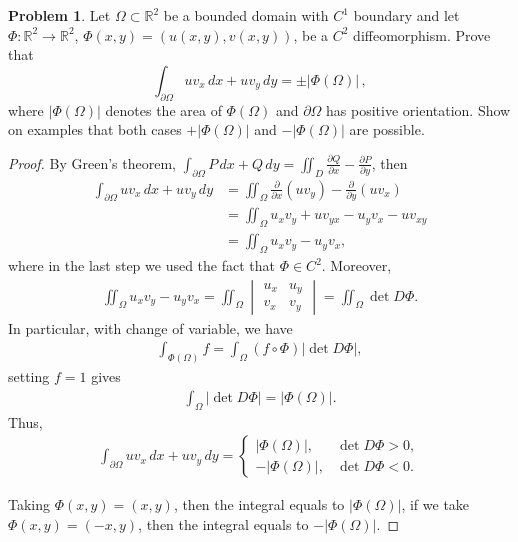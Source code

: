 \documentclass[11pt]{article}
\theoremstyle{definition}
\newtheorem{problem}{Problem}
\theoremstyle{definition}
\begin{document}
\medskip

\begin{problem}
Let $\Omega\subset\mathbb{R}^2$ be a bounded
domain with $C^1$ boundary and let $\Phi: \mathbb{R}^2 \to \mathbb{R}^2$, $\Phi(x,y) = (u(x,y), v(x,y))$,
be a $C^2$ diffeomorphism. Prove that
$$
\int_{\partial\Omega} uv_x\, dx + uv_y\, dy = \pm|\Phi(\Omega)|\, ,
$$
where $|\Phi(\Omega)|$ denotes the area of $\Phi(\Omega)$ and $\partial\Omega$ has positive orientation. Show on examples that both cases $+|\Phi(\Omega)|$ and $-|\Phi(\Omega)|$ are possible.
\end{problem}
\begin{proof}
By Green's theorem, $\int_{\partial \Omega} P\, dx + Q\, dy = \iint_D \frac{\partial Q}{\partial x} - \frac{\partial P}{\partial y}$, then
\begin{align*}
    \int_{\partial\Omega} uv_x\, dx + uv_y\, dy & = \iint_\Omega \frac{\partial}{\partial x} \left(uv_y \right) - \frac{\partial}{\partial y} \left(uv_x \right) \\
    & = \iint_\Omega u_xv_y + u v_{yx} - u_y v_x - u v_{xy} \\
    & = \iint_\Omega u_xv_y - u_y v_x,
\end{align*}
where in the last step we used the fact that $\Phi \in C^2$. Moreover, 
\begin{align*}
    \iint_\Omega u_xv_y - u_y v_x = \iint_\Omega \begin{vmatrix}
        u_x & u_y \\
        v_x & v_y
    \end{vmatrix} = \iint_\Omega \det D\Phi.
\end{align*}
In particular, with change of variable, we have
\begin{align*}
    \int_{\Phi(\Omega)} f = \int_{\Omega} (f\circ \Phi) |\det D\Phi|,
\end{align*}
setting $f = 1$ gives
\begin{align*}
    \int_{\Omega} |\det D\Phi| = |\Phi(\Omega)|.
\end{align*}
Thus, 
\begin{align*}
    \int_{\partial\Omega} uv_x\, dx + uv_y\, dy = 
    \begin{cases}
        |\Phi(\Omega)|, & \det D\Phi > 0, \\
        - |\Phi(\Omega)|, & \det D\Phi < 0.
    \end{cases}
\end{align*}

Taking $\Phi(x,y) = (x,y)$, then the integral equals to $|\Phi(\Omega)|$, if we take $\Phi(x,y) = (-x,y)$, then the integral equals to $-|\Phi(\Omega)|$.
\end{proof}
\end{document}
